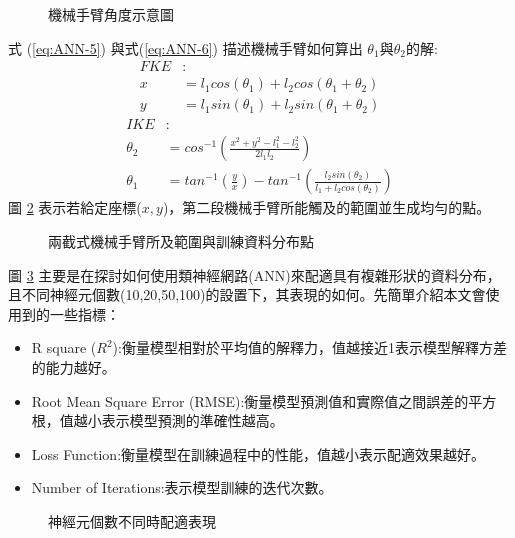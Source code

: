 \begin{figure}[H]
    \caption{機械手臂角度示意圖}
    \label{fig:機械手臂角度示意圖}
\end{figure}

式 (\ref{eq:ANN-5}) 與式(\ref{eq:ANN-6}) 描述機械手臂如何算出 $\theta _1$與$\theta _2$的解:
\begin{align}\label{eq:ANN-5}\nonumber
FKE&:\\ \nonumber
x&=l_1cos(\theta _1)+l_2cos(\theta_1+\theta _2)\\
y&=l_1sin(\theta_1)+l_2sin(\theta_1+\theta _2)
\end{align}
\begin{align}\label{eq:ANN-6}\nonumber
IKE&:\\ \nonumber
\theta_2&=cos^{-1}\left(\frac{x^2+y^2-l^2_1-l^2_2}{2l_1l_2}\right)\\
\theta_1&=tan^{-1}\left(\frac{y}{x}\right)-tan^{-1}\left(\frac{l_2sin(\theta _2)}{l_1+l_2cos(\theta _2)}\right)
\end{align}
圖 \ref{fig:兩截式機械手臂所及範圍與訓練資料分布點} 表示若給定座標($x,y$)，第二段機械手臂所能觸及的範圍並生成均勻的點。
\begin{figure}[H]
    \caption{兩截式機械手臂所及範圍與訓練資料分布點}
    \label{fig:兩截式機械手臂所及範圍與訓練資料分布點}
\end{figure}
圖 \ref{fig:神經元個數不同時配適表現} 主要是在探討如何使用類神經網路(ANN)來配適具有複雜形狀的資料分布，且不同神經元個數(10,20,50,100)的設置下，其表現的如何。先簡單介紹本文會使用到的一些指標：
\begin{itemize}
\item R square ($R^2$):衡量模型相對於平均值的解釋力，值越接近1表示模型解釋方差的能力越好。
\item Root Mean Square Error (RMSE):衡量模型預測值和實際值之間誤差的平方根，值越小表示模型預測的準確性越高。
\item Loss Function:衡量模型在訓練過程中的性能，值越小表示配適效果越好。
\item Number of Iterations:表示模型訓練的迭代次數。
\end{itemize}
\begin{figure}[h]
    \caption{神經元個數不同時配適表現}
    \label{fig:神經元個數不同時配適表現}
\end{figure}

